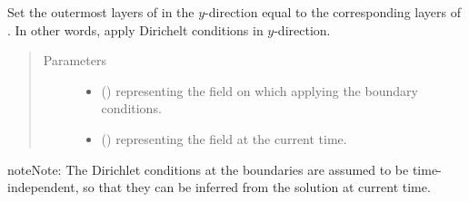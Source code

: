 \documentclass[letterpaper,10pt,english]{sphinxmanual}
\begin{document}
\begin{fulllineitems}
\begin{fulllineitems}
\label{\detokenize{api:tasmania.dycore.horizontal_boundary_relaxed.Relaxed.set_outermost_layers_y}}
Set the outermost layers of  in the \(y\)-direction equal to the corresponding
layers of . In other words, apply Dirichelt conditions in \(y\)-direction.
\begin{quote}\begin{description}
\item[{Parameters}] \leavevmode\begin{itemize}
\item {} 
 () \textendash{}  representing the field on which applying the boundary conditions.

\item {} 
 () \textendash{}  representing the field at the current time.

\end{itemize}

\end{description}\end{quote}

\begin{sphinxadmonition}{note}{Note:}
The Dirichlet conditions at the boundaries are assumed to be time-independent, so that they
can be inferred from the solution at current time.
\end{sphinxadmonition}

\end{fulllineitems}


\end{fulllineitems}

\end{document}
